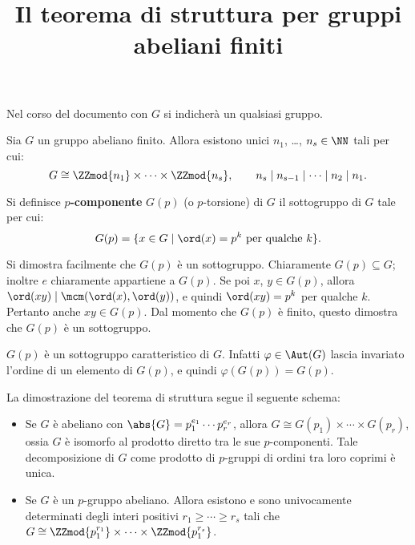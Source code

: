 \documentclass[12pt]{scrartcl}
\begin{document}
	\title{Il teorema di struttura per gruppi abeliani finiti}
	\maketitle
		
	\begin{note}
		Nel corso del documento con $G$ si indicherà un qualsiasi gruppo.
	\end{note}
	
	\begin{theorem}
		Sia $G$ un gruppo abeliano finito. Allora esistono unici
		$n_1$, \ldots, $n_s \in \NN$ tali per cui:
		\[ G \cong \ZZmod{n_1} \times \cdots \times \ZZmod{n_s}, \qquad n_s \mid n_{s-1} \mid \cdots \mid n_2 \mid n_1. \]
	\end{theorem}
	
	\begin{definition}[$p$-componente]
		Si definisce \textbf{$p$-componente} $G(p)$ (o $p$-torsione)
		di $G$ il sottogruppo di $G$ tale per cui:
		\[ G(p) = \{ x \in G \mid \ord(x) = p^k \text{ per qualche } k \}. \]
	\end{definition}
	
	\begin{remark}
		Si dimostra facilmente che $G(p)$ è un sottogruppo. Chiaramente
		$G(p) \subseteq G$; inoltre $e$ chiaramente appartiene
		a $G(p)$. Se poi $x$, $y \in G(p)$, allora
		$\ord(xy) \mid \mcm(\ord(x), \ord(y))$, e quindi
		$\ord(xy) = p^k$ per qualche $k$. Pertanto anche
		$xy \in G(p)$. Dal momento che $G(p)$ è finito,
		questo dimostra che $G(p)$ è un sottogruppo.
	\end{remark}
	
	\begin{remark}
		$G(p)$ è un sottogruppo caratteristico di $G$. Infatti
		$\varphi \in \Aut(G)$ lascia invariato l'ordine di
		un elemento di $G(p)$, e quindi $\varphi(G(p)) = G(p)$.
	\end{remark}
	
	\begin{remark}
		La dimostrazione del teorema di struttura segue
		il seguente schema:
		
		\begin{itemize}
			\item Se $G$ è abeliano con $\abs{G} = p_1^{e_1} \cdots p_r^{e_r}$, allora $G \cong G(p_1) \times \cdots \times G(p_r)$, ossia $G$ è isomorfo al prodotto diretto tra
			le sue $p$-componenti. Tale decomposizione di $G$
			come prodotto di $p$-gruppi di ordini tra loro
			coprimi è unica.
			\item Se $G$ è un $p$-gruppo abeliano. Allora esistono
			e sono univocamente determinati degli interi
			positivi $r_1 \geq \cdots \geq r_s$ tali che
			$G \cong \ZZmod{p_1^{r_1}} \times \cdots
			\times \ZZmod{p_1^{r_s}}$.
		\end{itemize}
	\end{remark}
	
\end{document}
